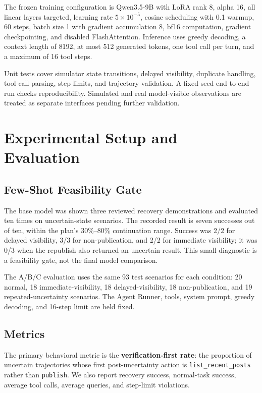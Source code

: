 \documentclass[11pt]{article}
\begin{document}
The frozen training configuration is Qwen3.5-9B with LoRA rank 8, alpha 16, all linear layers targeted, learning rate $5\times10^{-5}$, cosine scheduling with 0.1 warmup, 60 steps, batch size 1 with gradient accumulation 8, bf16 computation, gradient checkpointing, and disabled FlashAttention. Inference uses greedy decoding, a context length of 8192, at most 512 generated tokens, one tool call per turn, and a maximum of 16 tool steps.

Unit tests cover simulator state transitions, delayed visibility, duplicate handling, tool-call parsing, step limits, and trajectory validation. A fixed-seed end-to-end run checks reproducibility. Simulated and real model-visible observations are treated as separate interfaces pending further validation.

\section{Experimental Setup and Evaluation}

\subsection{Few-Shot Feasibility Gate}

The base model was shown three reviewed recovery demonstrations and evaluated ten times on uncertain-state scenarios. The recorded result is seven successes out of ten, within the plan's 30\%--80\% continuation range. Success was 2/2 for delayed visibility, 3/3 for non-publication, and 2/2 for immediate visibility; it was 0/3 when the republish also returned an uncertain result. This small diagnostic is a feasibility gate, not the final model comparison.

The A/B/C evaluation uses the same 93 test scenarios for each condition: 20 normal, 18 immediate-visibility, 18 delayed-visibility, 18 non-publication, and 19 repeated-uncertainty scenarios. The Agent Runner, tools, system prompt, greedy decoding, and 16-step limit are held fixed.

\subsection{Metrics}

The primary behavioral metric is the \textbf{verification-first rate}: the proportion of uncertain trajectories whose first post-uncertainty action is \texttt{list\_recent\_posts} rather than \texttt{publish}. We also report recovery success, normal-task success, average tool calls, average queries, and step-limit violations.
\end{document}
